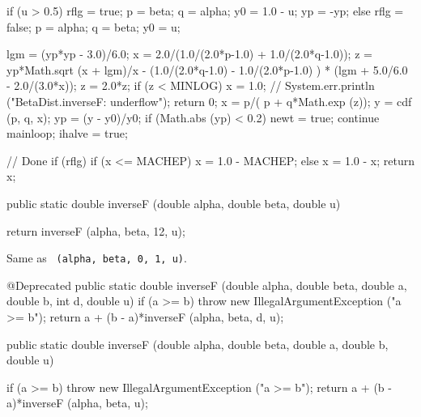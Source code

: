 \begin{code}
\begin{hide}
{{         if (u > 0.5) {
            rflg = true;
            p = beta;
            q = alpha;
            y0 = 1.0 - u;
            yp = -yp;
         }
         else {
            rflg = false;
            p = alpha;
            q = beta;
            y0 = u;
         }

         lgm = (yp*yp - 3.0)/6.0;
         x = 2.0/(1.0/(2.0*p-1.0)  +  1.0/(2.0*q-1.0));
         z = yp*Math.sqrt (x + lgm)/x
           - (1.0/(2.0*q-1.0) - 1.0/(2.0*p-1.0) )
           * (lgm + 5.0/6.0 - 2.0/(3.0*x));
         z = 2.0*z;
         if (z < MINLOG) {
            x = 1.0;
            // System.err.println ("BetaDist.inverseF: underflow");
            return 0;
         }
         x = p/( p + q*Math.exp (z));
         y = cdf (p, q, x);
         yp = (y - y0)/y0;
         if (Math.abs (yp) < 0.2) {
            newt = true;
            continue mainloop;
         }
         ihalve = true;
      }

      // Done
      if (rflg) {
         if (x <= MACHEP)
            x = 1.0 - MACHEP;
         else
            x = 1.0 - x;
      }
      return x;
   }\end{hide}

   public static double inverseF (double alpha, double beta, double u)\begin{hide} {
      return inverseF (alpha, beta, 12, u);
   }\end{hide}
\end{code}
\begin{tabb}   Same as
 ~\texttt{(alpha, beta, 0, 1, u)}.
\end{tabb}
\begin{code}\begin{hide}

   @Deprecated
   public static double inverseF (double alpha, double beta,
                                  double a, double b, int d, double u) {
      if (a >= b)
        throw new IllegalArgumentException ("a >= b");
      return a + (b - a)*inverseF (alpha, beta, d, u);
   }\end{hide}

   public static double inverseF (double alpha, double beta,
                                  double a, double b, double u)\begin{hide} {
      if (a >= b)
        throw new IllegalArgumentException ("a >= b");
      return a + (b - a)*inverseF (alpha, beta, u);
   }\end{hide}
\end{code}

